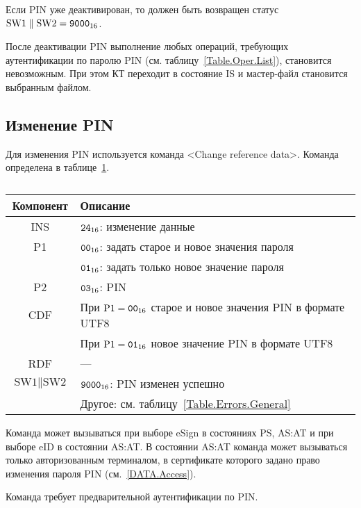 Если PIN уже деактивирован, то должен быть возвращен 
статус $\text{SW1} \parallel \text{SW2} = \texttt{9000}_{16}$.

После деактивации PIN выполнение любых операций, 
требующих аутентификации по паролю PIN (см. таблицу~\ref{Table.Oper.List}), 
становится невозможным. При этом КТ переходит в состояние IS и мастер-файл 
становится выбранным файлом. 

\subsection{Изменение PIN}
\label{Oper.Descr.ChangePIN}

Для изменения PIN используется команда <Change reference data>.
Команда определена в таблице~\ref{Table.Oper.ChangePINCmd}.

\begin{table}[hbt]
\caption{}\label{Table.Oper.ChangePINCmd}
\begin{tabular}{|c|p{14cm}|}
\hline
Компонент & 	Описание \\
\hline
\hline
INS & $\texttt{24}_{16}$: изменение данные\\
\hline
P1 & $\texttt{00}_{16}$: задать старое и новое значения пароля \\
\cline{2-2}
   & $\texttt{01}_{16}$: задать только новое значение пароля\\
\hline
P2 & $\texttt{03}_{16}$: PIN \\
\hline
CDF & При $\text{P1}=\texttt{00}_{16}$ старое и новое значения PIN в формате 
UTF8~\cite{UTF8}\\ 
\cline{2-2}
    & При $\text{P1}=\texttt{01}_{16}$ новое значение PIN в формате UTF8\\
\hline 
\hline
RDF & 	 --- \\
\hline
$\text{SW1}\parallel\text{SW2}$ & 
 $\texttt{9000}_{16}$: PIN изменен успешно \\
\cline{2-2}
  & Другое: см. таблицу~\ref{Table.Errors.General}\\
\hline
\end{tabular}
\end{table}

Команда может вызываться при выборе eSign в состояниях 
PS, AS:AT и при выборе eID в состоянии AS:AT. В состоянии AS:AT команда может 
вызываться только авторизованным терминалом, в сертификате которого задано 
право изменения пароля PIN (см.~\ref{DATA.Access}).

Команда требует предварительной аутентификации по PIN. 

